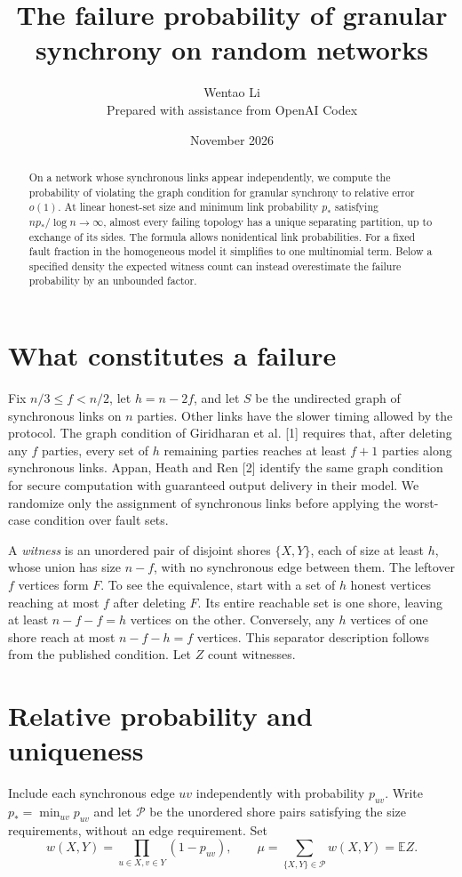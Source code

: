 \documentclass[11pt]{article}
\title{The failure probability of granular synchrony on random networks}
\author{Wentao Li\\[2pt]\small Prepared with assistance from OpenAI Codex}
\date{November 2026}
\begin{document}
\maketitle
\begin{abstract}
On a network whose synchronous links appear independently, we compute the probability of violating the graph condition for granular synchrony to relative error $o(1)$. At linear honest-set size and minimum link probability $p_*$ satisfying $np_*/\log n\to\infty$, almost every failing topology has a unique separating partition, up to exchange of its sides. The formula allows nonidentical link probabilities. For a fixed fault fraction in the homogeneous model it simplifies to one multinomial term. Below a specified density the expected witness count can instead overestimate the failure probability by an unbounded factor.
\end{abstract}

\section{What constitutes a failure}
Fix $n/3\le f<n/2$, let $h=n-2f$, and let $S$ be the undirected graph of synchronous links on $n$ parties. Other links have the slower timing allowed by the protocol. The graph condition of Giridharan et al. [1] requires that, after deleting any $f$ parties, every set of $h$ remaining parties reaches at least $f+1$ parties along synchronous links. Appan, Heath and Ren [2] identify the same graph condition for secure computation with guaranteed output delivery in their model. We randomize only the assignment of synchronous links before applying the worst-case condition over fault sets.

A \emph{witness} is an unordered pair of disjoint shores $\{X,Y\}$, each of size at least $h$, whose union has size $n-f$, with no synchronous edge between them. The leftover $f$ vertices form $F$. To see the equivalence, start with a set of $h$ honest vertices reaching at most $f$ after deleting $F$. Its entire reachable set is one shore, leaving at least $n-f-f=h$ vertices on the other. Conversely, any $h$ vertices of one shore reach at most $n-f-h=f$ vertices. This separator description follows from the published condition. Let $Z$ count witnesses.

\section{Relative probability and uniqueness}
Include each synchronous edge $uv$ independently with probability $p_{uv}$. Write $p_*=\min_{uv}p_{uv}$ and let $\mathcal P$ be the unordered shore pairs satisfying the size requirements, without an edge requirement. Set
\[
 w(X,Y)=\prod_{u\in X,v\in Y}(1-p_{uv}),\qquad
 \mu=\sum_{\{X,Y\}\in\mathcal P}w(X,Y)=\mathbb E Z.
\]
\end{document}
